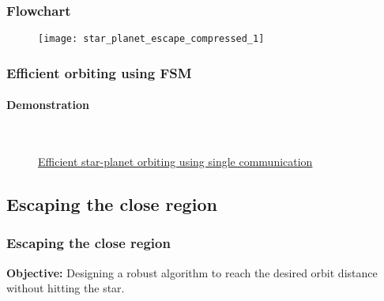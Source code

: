 \begin{frame}
\frametitle{Flowchart}
\begin{figure}[H]
	\centering
	\texttt{[image: star\_planet\_escape\_compressed\_1]}
\end{figure}
\end{frame}

\begin{frame}
\frametitle{Efficient orbiting using FSM}
\framesubtitle{Demonstration}
	\begin{figure}[H]
		\begin{center}
		\\
		\hspace{5cm}
		\caption{\href{https://youtu.be/LRgOzhAJI1k}{Efficient star-planet orbiting using single communication}}
		\label{fig:shape_formation_demo}
	\end{center}
	\end{figure}
\end{frame}

\subsection{Escaping the close region}
\begin{frame}
\frametitle{Escaping the close region}
\textbf{Objective:} Designing a robust algorithm to reach the desired orbit distance without hitting the star.
\end{frame}

